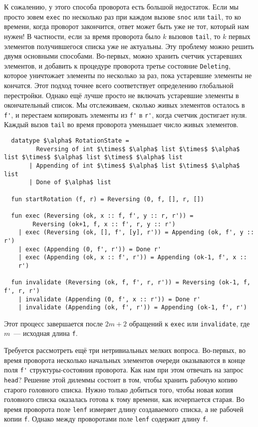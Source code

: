 К сожалению, у этого способа проворота есть большой недостаток. Если
мы просто зовем \lstinline!exec! по несколько раз
при каждом вызове \lstinline!snoc! или \lstinline!tail!, то ко
времени, когда проворот закончится, ответ может быть уже не тот,
который нам нужен! В частности, если за время проворота было $k$
вызовов \lstinline!tail!, то $k$ первых элементов получившегося списка
уже не актуальны. Эту проблему можно решить двумя основными
способами. Во-первых, можно хранить счетчик устаревших элементов, и
добавить к процедуре проворота третье состояние \lstinline!Deleting!,
которое уничтожает элементы по несколько за раз, пока устаревшие
элементы не кончатся. Этот подход точнее всего соответствует
определению глобальной перестройки. Однако ещё лучше просто не
включать устаревшие элементы в окончательный список. Мы отслеживаем,
сколько живых элементов осталось в \lstinline!f'!, и перестаем
копировать элементы из \lstinline!f'! в \lstinline!r'!, когда счетчик
достигает нуля. Каждый вызов \lstinline!tail! во время проворота
уменьшает число живых элементов.
\begin{lstlisting}
  datatype $\alpha$ RotationState =
         Reversing of int $\times$ $\alpha$ list $\times$ $\alpha$ list $\times$ $\alpha$ list $\times$ $\alpha$ list
       | Appending of int $\times$ $\alpha$ list $\times$ $\alpha$ list
       | Done of $\alpha$ list

  fun startRotation (f, r) = Reversing (0, f, [], r, [])

  fun exec (Reversing (ok, x :: f, f', y :: r, r')) =
        Reversing (ok+1, f, x :: f', r, y :: r')
    | exec (Reversing (ok, [], f', [y], r')) = Appending (ok, f', y :: r')
    | exec (Appending (0, f', r')) = Done r'
    | exec (Appending (ok, x :: f', r')) = Appending (ok-1, f', x ::
    r')

  fun invalidate (Reversing (ok, f, f', r, r')) = Reversing (ok-1, f, f', r, r')
    | invalidate (Appending (0, f', x :: r')) = Done r'
    | invalidate (Appending (ok, f', r')) = Appending (ok-1, f', r')
\end{lstlisting}
Этот процесс завершается после $2m + 2$ обращений к \lstinline!exec! или
\lstinline!invalidate!, где $m$~--- исходная длина \lstinline!f!.

Требуется рассмотреть ещё три нетривиальных мелких вопроса. Во-первых,
во время проворота несколько начальных элементов очереди оказываются в
конце поля \lstinline!f'! структуры-состояния проворота. Как нам при
этом отвечать на запрос \lstinline!head!? Решение этой дилеммы состоит
в том, чтобы хранить рабочую копию старого головного списка. Нужно
только добиться того, чтобы новая копия головного списка оказалась
готова к тому времени, как исчерпается старая. Во время проворота поле
\lstinline!lenf! измеряет длину создаваемого списка, а не рабочей
копии \lstinline!f!. Однако между проворотами поле \lstinline!lenf!
содержит длину \lstinline!f!.

